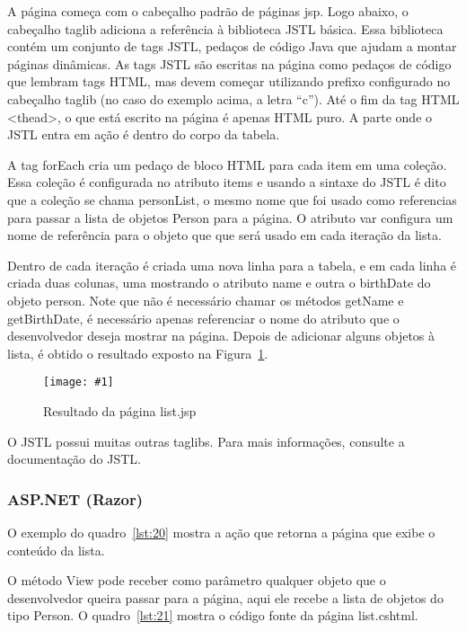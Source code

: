 \documentclass[a4paper,12pt]{article}
\newcommand{\figura}[3] {
	\begin{figure}[ht]
		\centering
		\texttt{[image: \#1]}
		\caption{#2}
		\label{#3}
	\end{figure}
	\FloatBarrier
}
\newcommand{\sharpcode}[3] {
	
	\FloatBarrier
}
\newcommand{\jspcode}[3] {
	
	\FloatBarrier
}
\begin{document}
\jspcode{code/19.txt}{Código da página list.jsp}{lst:19}

A página começa com o cabeçalho padrão de páginas jsp. Logo abaixo, o cabeçalho taglib adiciona a referência à biblioteca JSTL básica. Essa biblioteca contém um conjunto de tags JSTL, pedaços de código Java que ajudam a montar páginas dinâmicas. As tags JSTL são escritas na página como pedaços de código que lembram tags HTML, mas devem começar utilizando prefixo configurado no cabeçalho taglib (no caso do exemplo acima, a letra “c”). Até o fim da tag HTML <thead>, o que está escrito na página é apenas HTML puro. A parte onde o JSTL entra em ação é dentro do corpo da tabela. 

A tag forEach cria um pedaço de bloco HTML para cada item em uma coleção. Essa coleção é configurada no atributo items e usando a sintaxe do JSTL é dito que a coleção se chama personList, o mesmo nome que foi usado como referencias para passar a lista de objetos Person para a página. O atributo var configura um nome de referência para o objeto que que será usado em cada iteração da lista.

Dentro de cada iteração é criada uma nova linha para a tabela, e em cada linha é criada duas colunas, uma mostrando o atributo name e outra o birthDate do objeto person. Note que não é necessário chamar os métodos getName e getBirthDate, é necessário apenas referenciar o nome do atributo que o desenvolvedor deseja mostrar na página. Depois de adicionar alguns objetos à lista, é obtido o resultado exposto na Figura~\ref{fig:34}.

\figura{34.png}{Resultado da página list.jsp}{fig:34}

O JSTL possui muitas outras taglibs. Para mais informações, consulte a documentação do JSTL.

\subsubsection{ASP.NET (Razor)}

O exemplo do quadro~\ref{lst:20} mostra a ação que retorna a página que exibe o conteúdo da lista.

\sharpcode{code/20.txt}{Ação que retorna a página list.cshtml}{lst:20}

O método View pode receber como parâmetro qualquer objeto que o desenvolvedor queira passar para a página, aqui ele recebe a lista de objetos do tipo Person. O quadro~\ref{lst:21} mostra o código fonte da página list.cshtml.
\end{document}
